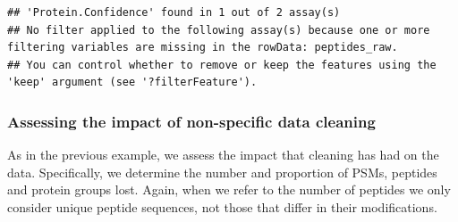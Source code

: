 \documentclass[9pt,a4paper,]{extarticle}
\begin{document}
\begin{verbatim}
## 'Protein.Confidence' found in 1 out of 2 assay(s)
## No filter applied to the following assay(s) because one or more filtering variables are missing in the rowData: peptides_raw.
## You can control whether to remove or keep the features using the 'keep' argument (see '?filterFeature').
\end{verbatim}

\subsubsection{Assessing the impact of non-specific data cleaning}\label{assessing-the-impact-of-non-specific-data-cleaning-1}

As in the previous example, we assess the impact that cleaning has had on the
data. Specifically, we determine the number and proportion of PSMs, peptides and
protein groups lost. Again, when we refer to the number of peptides we only consider
unique peptide sequences, not those that differ in their modifications.
\end{document}
